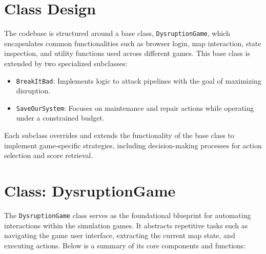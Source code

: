 \documentclass[12pt,a4paper]{report}
\begin{document}
    \section*{Class Design}
    \label{subsec:class-design}

    The codebase is structured around a base class, \texttt{DysruptionGame}, which encapsulates common functionalities such as browser login, map interaction, state inspection, and utility functions used across different games. This base class is extended by two specialized subclasses:

    \begin{itemize}
        \item \texttt{BreakItBad}: Implements logic to attack pipelines with the goal of maximizing disruption.
        \item \texttt{SaveOurSystem}: Focuses on maintenance and repair actions while operating under a constrained budget.
    \end{itemize}

    Each subclass overrides and extends the functionality of the base class to implement game-specific strategies, including decision-making processes for action selection and score retrieval.

    \section*{Class: DysruptionGame}
    \label{subsec:class-dysruptiongame}

        The \texttt{DysruptionGame} class serves as the foundational blueprint for automating interactions within the simulation games. It abstracts repetitive tasks such as navigating the game user interface, extracting the current map state, and executing actions. Below is a summary of its core components and functions:
\end{document}
